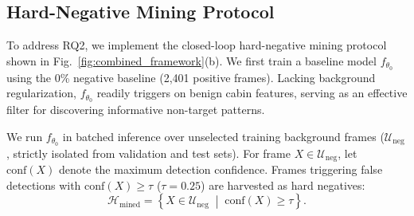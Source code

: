 \documentclass[conference]{IEEEtran}
\begin{document}
\subsection{Hard-Negative Mining Protocol}
\label{subsec:mining}
To address RQ2, we implement the closed-loop hard-negative mining protocol shown in Fig.~\ref{fig:combined_framework}(b). We first train a baseline model $f_{\theta_0}$ using the 0\% negative baseline (2,401 positive frames). Lacking background regularization, $f_{\theta_0}$ readily triggers on benign cabin features, serving as an effective filter for discovering informative non-target patterns.

We run $f_{\theta_0}$ in batched inference over unselected training background frames ($\mathcal{U}_{\mathrm{neg}}$, strictly isolated from validation and test sets). For frame $X \in \mathcal{U}_{\mathrm{neg}}$, let $\mathrm{conf}(X)$ denote the maximum detection confidence. Frames triggering false detections with $\mathrm{conf}(X) \ge \tau$ ($\tau = 0.25$) are harvested as hard negatives:
\begin{equation}
\mathcal{H}_{\mathrm{mined}} = \left\{ X \in \mathcal{U}_{\mathrm{neg}} \;\middle|\; \mathrm{conf}(X) \ge \tau \right\}.
\label{eq:mining_set}
\end{equation}
\end{document}

